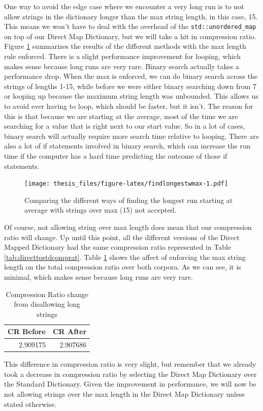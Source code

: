 \documentclass[12pt,twoside]{reedthesis}
\begin{document}
One way to avoid the edge case where we encounter a very long run is to not allow strings in the dictionary longer than the max string length, in this case, 15. This means we won't have to deal with the overhead of the \texttt{std::unordered\_map} on top of our Direct Map Dictionary, but we will take a hit in compression ratio. Figure \ref{fig:findlongestwmax} summarizes the results of the different methods with the max length rule enforced. There is a slight performance improvement for looping, which makes sense because long runs are very rare. Binary search actually takes a performance drop. When the max is enforced, we can do binary search across the strings of lengths 1-15, while before we were either binary searching down from 7 or looping up because the maximum string length was unbounded. This allows us to avoid ever having to loop, which should be faster, but it isn't. The reason for this is that because we are starting at the average, most of the time we are searching for a value that is right next to our start value. So in a lot of cases, binary search will actually require more search time relative to looping. There are also a lot of if statements involved in binary search, which can increase the run time if the computer has a hard time predicting the outcome of those if statements.
\begin{figure}
\centering
\texttt{[image: thesis\_files/figure-latex/findlongestwmax-1.pdf]}
\caption{\label{fig:findlongestwmax}Comparing the different ways of finding the longest run starting at average with strings over max (15) not accepted.}
\end{figure}
Of course, not allowing string over max length does mean that our compression ratio will change. Up until this point, all the different versions of the Direct Mapped Dictionary had the same compression ratio represented in Table \ref{tab:directtostdcomprat}. Table \ref{tab:maxenforcedstats} shows the affect of enforcing the max string length on the total compression ratio over both corpora. As we can see, it is minimal, which makes sense because long runs are very rare.
\begin{table}

\caption{\label{tab:maxenforcedstats}Compression Ratio change from disallowing long strings}
\centering
\begin{tabular}[t]{rr}
\toprule
CR Before & CR After\\
\midrule
2.909175 & 2.907686\\
\bottomrule
\end{tabular}
\end{table}
This difference in compression ratio is very slight, but remember that we already took a decrease in compression ratio by selecting the Direct Map Dictionary over the Standard Dictionary. Given the improvement in performance, we will now be not allowing strings over the max length in the Direct Map Dictionary unless stated otherwise.
\end{document}
